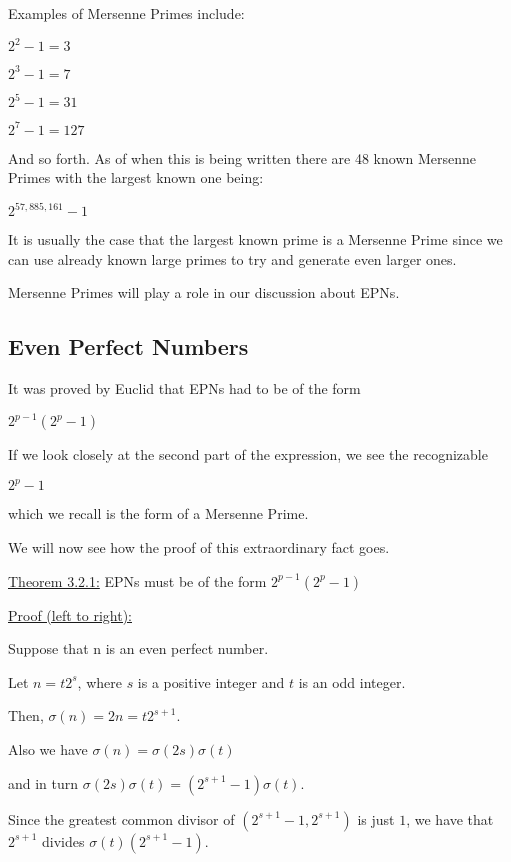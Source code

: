 \documentclass[12pt]{amsart}
\begin{document}
Examples of Mersenne Primes include:
\begin{center}
$2^2 - 1 = 3$

$2^3 - 1 = 7$

$2^5 - 1 = 31$

$2^7 - 1 = 127$
\end{center}

And so forth. As of when this is being written there are 48 known Mersenne Primes with the largest known one being:
\begin{center}
$2^{57,885,161} - 1$
\end{center}

It is usually the case that the largest known prime is a Mersenne Prime since we can use already known large primes to try and generate even larger ones.

Mersenne Primes will play a role in our discussion about EPNs.

\subsection{Even Perfect Numbers}

It was proved by Euclid that EPNs had to be of the form
\begin{center}
$2^{p-1} (2^p - 1)$
\end{center}

If we look closely at the second part of the expression, we see the recognizable 
\begin{center}
$2^p - 1$
\end{center}
which we recall is the form of a Mersenne Prime.

We will now see how the proof of this extraordinary fact goes.

\bigbreak

\underline{Theorem 3.2.1:} EPNs must be of the form $2^{p-1} (2^p - 1)$

\bigbreak

\underline{Proof (left to right):} 

Suppose that n is an even perfect number. 

Let $n = t2^{s}$, where $s$ is a positive integer and $t$ is an odd integer.

Then, $\sigma(n)=2n= t2^{s+1}$. 

Also we have $\sigma(n) = \sigma(2s)\sigma(t)$ 

and in turn $\sigma(2s)\sigma(t)=(2^{s+1}-1)\sigma(t)$.

Since the greatest common divisor of $(2^{s+1}-1, 2^{s+1})$ is just $1$, we have that $2^{s+1}$ divides $\sigma(t) (2^{s+1}-1)$.
\end{document}
